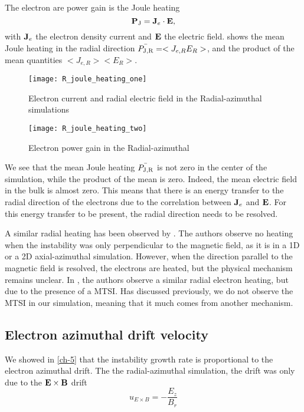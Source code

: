 The electron are power gain is the Joule heating
\begin{equation} \label{eq-epower}
    {\mathbf P_{\rm J}} = {\mathbf J_e} \cdot {\mathbf E},
\end{equation}
with ${\mathbf J_e}$ the electron density current and ${\mathbf E}$ the electric field.
 shows the mean Joule heating in the radial direction $\bar{P_{\rm J, R}} = < J_{e, R} E_R >$, and the product of the mean quantities $< J_{e, R}>  < E_R >$.

\begin{figure}[hbtp]
  \centering
  \texttt{[image: R\_joule\_heating\_one]}
  \caption{Electron current and radial electric field in the Radial-azimuthal simulations }
  \label{fig-epower_radialone}
\end{figure}


\begin{figure}[hbtp]
  \centering
  \texttt{[image: R\_joule\_heating\_two]}
  \caption{Electron power gain in the Radial-azimuthal }
  \label{fig-epower_radial}
\end{figure}

We see that the mean Joule heating $\bar{P_{\rm J, R}}$ is not zero in the center of the simulation, while the product of the mean is zero.
Indeed, the mean electric field in the bulk is almost zero.
This means that there is an energy transfer to the radial direction of the electrons due to the correlation between ${\mathbf J_e}$ and ${\mathbf E}$.
For this energy transfer to be present, the radial direction needs to be resolved.

A similar radial heating has been observed by \citet{heron2013}.
The authors observe no heating when the instability was only perpendicular to the magnetic field, as it is in a \ac{1D} or a \ac{2D} axial-azimuthal simulation.
However, when the direction parallel to the magnetic field is resolved, the electrons are heated, but the physical mechanism remains unclear.
In \citet{janhunen}, the authors observe a similar radial electron heating, but due to the presence of a \ac{MTSI}.
Has discussed previously, we do not observe the \ac{MTSI} in our simulation, meaning that it much comes from another mechanism.


\subsection{Electron azimuthal drift velocity} \label{subsec-drift}

We showed in \cref{ch-5} that the instability growth rate is proportional to the electron azimuthal drift.
The the radial-azimuthal simulation, the drift was only due to the ${\mathbf E} \times {\mathbf B}$ drift
\begin{equation} \label{eq-exbdrift}
  u_{E \times B} = - \frac{E_z}{B_r}
\end{equation}

